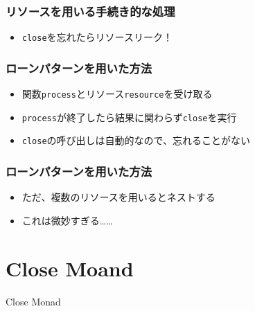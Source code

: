 \begin{frame}
  \frametitle{リソースを用いる手続き的な処理}

  
  \begin{itemize}
    \item<3-> \lstinline|close|を忘れたらリソースリーク！
  \end{itemize}
\end{frame}

\begin{frame}
  \frametitle{ローンパターン\cite{loanpattern}を用いた方法}

  
  \begin{itemize}
    \item<3-> 関数\lstinline|process|とリソース\lstinline|resource|を受け取る
    \item<4-> \lstinline|process|が終了したら結果に関わらず\lstinline|close|を実行
    \item<5-> \lstinline|close|の呼び出しは自動的なので、忘れることがない
  \end{itemize}
\end{frame}

\begin{frame}
  \frametitle{ローンパターン\cite{loanpattern}を用いた方法}

  \begin{itemize}
    \item ただ、複数のリソースを用いるとネストする
  \end{itemize}


  \begin{itemize}
    \item<3-> これは微妙すぎる……
  \end{itemize}
\end{frame}

\section{Close Moand}

\begin{frame}
  \centering
  {\Huge Close Monad}
\end{frame}

